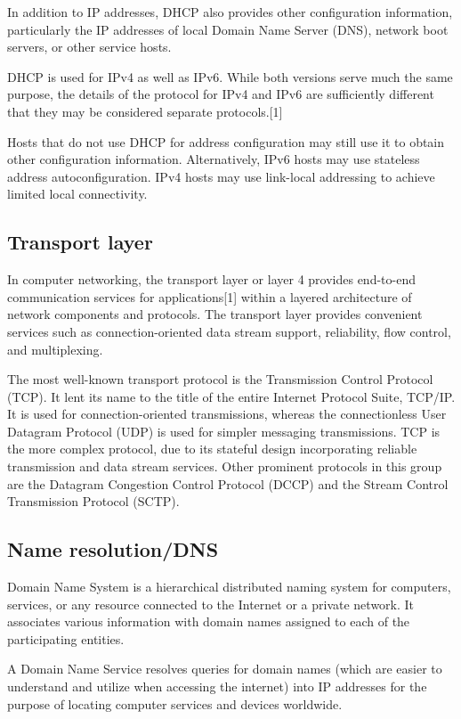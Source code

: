 \documentclass[a4paper,oneside]{report}
\begin{document}
	  In addition to IP addresses, DHCP also provides other configuration information, particularly the IP addresses of local Domain Name Server (DNS), network boot servers, or other service hosts.

	 DHCP is used for IPv4 as well as IPv6. While both versions serve much the same purpose, the details of the protocol for IPv4 and IPv6 are sufficiently different that they may be considered separate protocols.[1]

	 Hosts that do not use DHCP for address configuration may still use it to obtain other configuration information. Alternatively, IPv6 hosts may use stateless address autoconfiguration. IPv4 hosts may use link-local addressing to achieve limited local connectivity.


    	\subsection{Transport layer}
	 In computer networking, the transport layer or layer 4 provides end-to-end communication services for applications[1] within a layered architecture of network components and protocols. The transport layer provides convenient services such as connection-oriented data stream support, reliability, flow control, and multiplexing.
	
	 The most well-known transport protocol is the Transmission Control Protocol (TCP). It lent its name to the title of the entire Internet Protocol Suite, TCP/IP. It is used for connection-oriented transmissions, whereas the connectionless User Datagram Protocol (UDP) is used for simpler messaging transmissions. TCP is the more complex protocol, due to its stateful design incorporating reliable transmission and data stream services. Other prominent protocols in this group are the Datagram Congestion Control Protocol (DCCP) and the Stream Control Transmission Protocol (SCTP).


    	\subsection{Name resolution/DNS}
	Domain Name System  is a hierarchical distributed naming system for computers, services, or any resource connected to the Internet or a private network. It associates various information with domain names assigned to each of the participating entities.

	  A Domain Name Service resolves queries for domain names (which are easier to understand and utilize when accessing the internet) into IP addresses for the purpose of locating computer services and devices worldwide.
\end{document}

